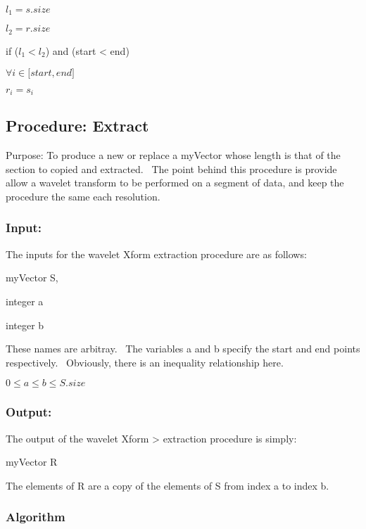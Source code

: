 \qquad $l_{1}=s.size$

\qquad $l_{2}=r.size$

\qquad if ($l_{1}<l_{2}$) and (start < end)

\qquad \qquad $\forall i\in \lbrack start,end]$

\qquad \qquad \qquad $r_{i}=s_{i}$

\bigskip

\subsection{Procedure: Extract}

Purpose: To produce a new or replace a myVector whose length is that of the
section to copied and extracted. \ The point behind this procedure is
provide allow a wavelet transform to be performed on a segment of data, and
keep the procedure the same each resolution. \ 

\bigskip

\subsubsection{Input:}

The inputs for the wavelet Xform extraction procedure are as
follows:

\qquad myVector S,

\qquad integer a \ 

\qquad integer b \ 

These names are arbitray. \ The variables a and b specify the start and end
points respectively. \ Obviously, there is an inequality relationship here.

\qquad $0\leq a\leq b\leq S.size$

\bigskip

\subsubsection{Output:}

The output of the wavelet Xform > extraction procedure is
simply:

\qquad myVector R

The elements of R are a copy of the elements of S from index a to index b.

\bigskip

\subsubsection{Algorithm}

